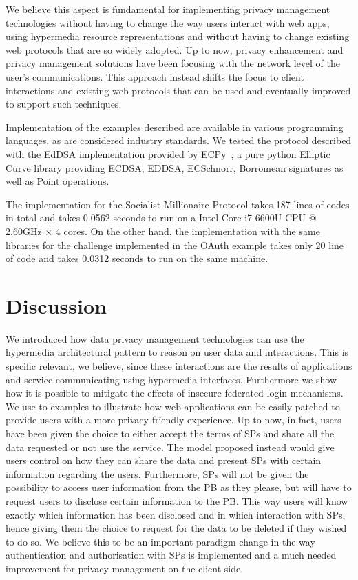We believe this aspect is fundamental for implementing privacy management technologies without having to change the way users interact with web apps, using hypermedia resource representations and without having to change existing web protocols that are so widely adopted. Up to now, privacy enhancement and privacy management solutions have been focusing with the network level of the user's communications. This approach instead shifts the focus to client interactions and existing web protocols that can be used and eventually improved to support such techniques.

Implementation of the examples described are available in various programming languages, as are considered industry standards. We tested the protocol described with the EdDSA implementation provided by ECPy~\cite{ecpy}, a pure python Elliptic Curve library providing ECDSA, EDDSA, ECSchnorr, Borromean signatures as well as Point operations.

The implementation for the Socialist Millionaire Protocol takes 187 lines of codes in total and takes 0.0562 seconds to run on a Intel Core i7-6600U CPU @ 2.60GHz × 4 cores. On the other hand, the implementation with the same libraries for the challenge implemented in the OAuth example takes only 20 line of code and takes 0.0312 seconds to run on the same machine.

\section{Discussion}

We introduced how data privacy management technologies can use the hypermedia architectural pattern to reason on user data and interactions. This is specific relevant, we believe, since these interactions are the results of applications and service communicating using hypermedia interfaces. 
Furthermore we show how it is possible to mitigate the effects of insecure federated login mechanisms. We use to examples to illustrate how web applications can be easily patched to provide users with a more privacy friendly experience. Up to now, in fact, users have been given the choice to either accept the terms of SPs and share all the data requested or not use the service. The model proposed instead would give users control on how they can share the data and present SPs with certain information regarding the users. 
Furthermore, SPs will not be given the possibility to access user information from the PB as they please, but will have to request users to disclose certain information to the PB. This way users will know exactly which information has been disclosed and in which interaction with SPs, hence giving them the choice to request for the data to be deleted if they wished to do so.
We believe this to be an important paradigm change in the way authentication and authorisation with SPs is implemented and a much needed improvement for privacy management on the client side.